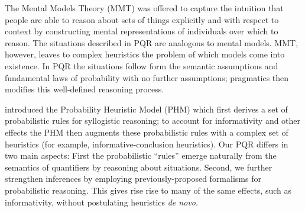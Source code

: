 \documentclass[10pt,letterpaper]{article}
\begin{document}
The Mental Models Theory (MMT) was offered to capture the intuition that people are able to reason about sets of things explicitly and with respect to context by constructing mental representations of individuals over which to reason. The situations described in PQR are analogous to mental models. MMT, however, leaves to complex heuristics the problem of which models come into existence. In PQR the situations follow form the semantic assumptions and fundamental laws of probability with no further assumptions; pragmatics then modifies this well-defined reasoning process.

 introduced the Probability Heuristic Model (PHM) which first derives a set of probabilistic rules for syllogistic reasoning; to account for informativity and other effects the PHM then augments these probabilistic rules with a complex set of heuristics (for example, informative-conclusion heuristics). Our PQR differs in two main aspects: First the probabilistic ``rules'' emerge naturally from the semantics of quantifiers by reasoning about situations. Second, we further strengthen inferences by employing previously-proposed formalisms for probabilistic reasoning. This gives rise rise to many of the same effects, such as informativity, without postulating heuristics \emph{de novo}.


\end{document}
